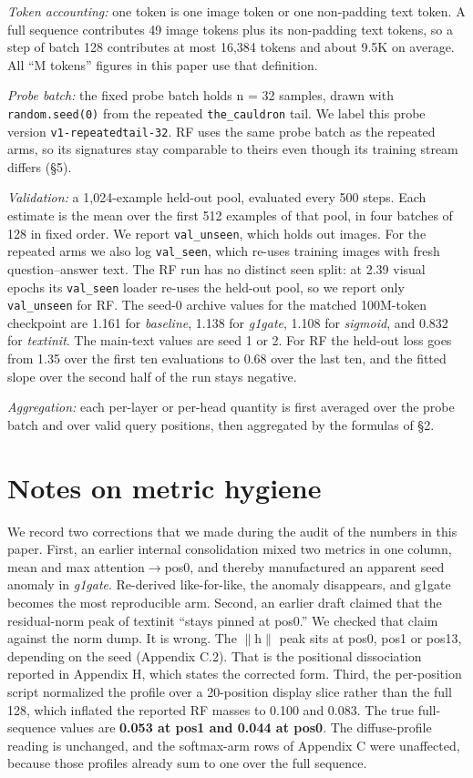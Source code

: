\documentclass{article}
\begin{document}
\textit{Token accounting:} one token is one image token or one non-padding text token. A full sequence contributes 49 image tokens plus its non-padding text tokens, so a step of batch 128 contributes at most 16,384 tokens and about 9.5K on average. All ``M tokens'' figures in this paper use that definition.

\textit{Probe batch:} the fixed probe batch holds n = 32 samples, drawn with \texttt{random.seed(0)} from the repeated \texttt{the\_cauldron} tail. We label this probe version \texttt{v1-repeatedtail-32}. RF uses the same probe batch as the repeated arms, so its signatures stay comparable to theirs even though its training stream differs (\S5).

\textit{Validation:} a 1,024-example held-out pool, evaluated every 500 steps. Each estimate is the mean over the first 512 examples of that pool, in four batches of 128 in fixed order. We report \texttt{val\_unseen}, which holds out images. For the repeated arms we also log \texttt{val\_seen}, which re-uses training images with fresh question--answer text. The RF run has no distinct seen split: at 2.39 visual epochs its \texttt{val\_seen} loader re-uses the held-out pool, so we report only \texttt{val\_unseen} for RF. The seed-0 archive values for the matched 100M-token checkpoint are 1.161 for \textit{baseline}, 1.138 for \textit{g1gate}, 1.108 for \textit{sigmoid}, and 0.832 for \textit{textinit}. The main-text values are seed 1 or 2. For RF the held-out loss goes from 1.35 over the first ten evaluations to 0.68 over the last ten, and the fitted slope over the second half of the run stays negative.

\textit{Aggregation:} each per-layer or per-head quantity is first averaged over the probe batch and over valid query positions, then aggregated by the formulas of \S2.

\section{Notes on metric hygiene}

We record two corrections that we made during the audit of the numbers in this paper. First, an earlier internal consolidation mixed two metrics in one column, mean and max attention$\rightarrow$pos0, and thereby manufactured an apparent seed anomaly in \textit{g1gate}. Re-derived like-for-like, the anomaly disappears, and g1gate becomes the most reproducible arm. Second, an earlier draft claimed that the residual-norm peak of textinit ``stays pinned at pos0.'' We checked that claim against the norm dump. It is wrong. The $\|$h$\|$ peak sits at pos0, pos1 or pos13, depending on the seed (Appendix C.2). That is the positional dissociation reported in Appendix H, which states the corrected form. Third, the per-position script normalized the profile over a 20-position display slice rather than the full 128, which inflated the reported RF masses to 0.100 and 0.083. The true full-sequence values are \textbf{0.053 at pos1 and 0.044 at pos0}. The diffuse-profile reading is unchanged, and the softmax-arm rows of Appendix C were unaffected, because those profiles already sum to one over the full sequence.
\end{document}
